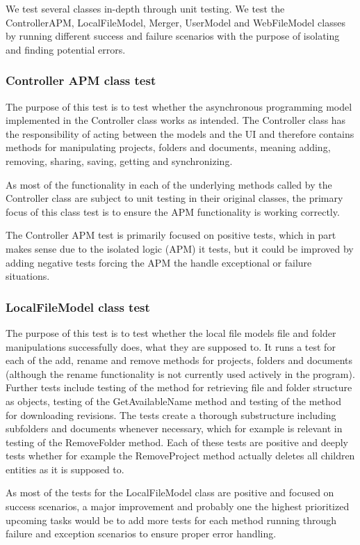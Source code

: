 We test several classes in-depth through unit testing. We test the ControllerAPM, LocalFileModel, Merger, UserModel and WebFileModel classes by running different success and failure scenarios with the purpose of isolating and finding potential errors.

\subsubsection{Controller APM class test}
The purpose of this test is to test whether the asynchronous programming model implemented in the Controller class works as intended. The Controller class has the responsibility of acting between the models and the UI and therefore contains methods for manipulating projects, folders and documents, meaning adding, removing, sharing, saving, getting and synchronizing.

As most of the functionality in each of the underlying methods called by the Controller class are subject to unit testing in their original classes, the primary focus of this class test is to ensure the APM functionality is working correctly.

The Controller APM test is primarily focused on positive tests, which in part makes sense due to the isolated logic (APM) it tests, but it could be improved by adding negative tests forcing the APM the handle exceptional or failure situations.

\subsubsection{LocalFileModel class test}
The purpose of this test is to test whether the local file models file and folder manipulations successfully does, what they are supposed to. It runs a test for each of the add, rename and remove methods for projects, folders and documents (although the rename functionality is not currently used actively in the program). Further tests include testing of the method for retrieving file and folder structure as objects, testing of the GetAvailableName method and testing of the method for downloading revisions. The tests create a thorough substructure including subfolders and documents whenever necessary, which for example is relevant in testing of the RemoveFolder method. Each of these tests are positive and deeply tests whether for example the RemoveProject method actually deletes all children entities as it is supposed to.

As most of the tests for the LocalFileModel class are positive and focused on success scenarios, a major improvement and probably one the highest prioritized upcoming tasks would be to add more tests for each method running through failure and exception scenarios to ensure proper error handling.

